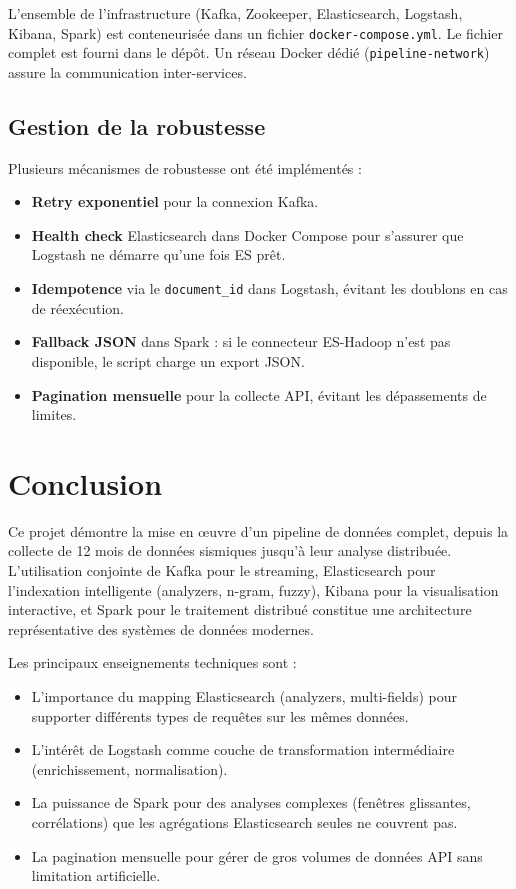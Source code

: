 \documentclass[12pt,a4paper]{article}
\begin{document}
L'ensemble de l'infrastructure (Kafka, Zookeeper, Elasticsearch, Logstash, Kibana, Spark) est conteneurisée dans un fichier \texttt{docker-compose.yml}. Le fichier complet est fourni dans le dépôt. Un réseau Docker dédié (\texttt{pipeline-network}) assure la communication inter-services.

\subsection{Gestion de la robustesse}

Plusieurs mécanismes de robustesse ont été implémentés :

\begin{itemize}[noitemsep]
    \item \textbf{Retry exponentiel} pour la connexion Kafka.
    \item \textbf{Health check} Elasticsearch dans Docker Compose pour s'assurer que Logstash ne démarre qu'une fois ES prêt.
    \item \textbf{Idempotence} via le \texttt{document\_id} dans Logstash, évitant les doublons en cas de réexécution.
    \item \textbf{Fallback JSON} dans Spark : si le connecteur ES-Hadoop n'est pas disponible, le script charge un export JSON.
    \item \textbf{Pagination mensuelle} pour la collecte API, évitant les dépassements de limites.
\end{itemize}

\section{Conclusion}

Ce projet démontre la mise en \oe uvre d'un pipeline de données complet, depuis la collecte de 12 mois de données sismiques jusqu'à leur analyse distribuée. L'utilisation conjointe de Kafka pour le streaming, Elasticsearch pour l'indexation intelligente (analyzers, n-gram, fuzzy), Kibana pour la visualisation interactive, et Spark pour le traitement distribué constitue une architecture représentative des systèmes de données modernes.

Les principaux enseignements techniques sont :

\begin{itemize}[noitemsep]
    \item L'importance du mapping Elasticsearch (analyzers, multi-fields) pour supporter différents types de requêtes sur les mêmes données.
    \item L'intérêt de Logstash comme couche de transformation intermédiaire (enrichissement, normalisation).
    \item La puissance de Spark pour des analyses complexes (fenêtres glissantes, corrélations) que les agrégations Elasticsearch seules ne couvrent pas.
    \item La pagination mensuelle pour gérer de gros volumes de données API sans limitation artificielle.
\end{itemize}
\end{document}
